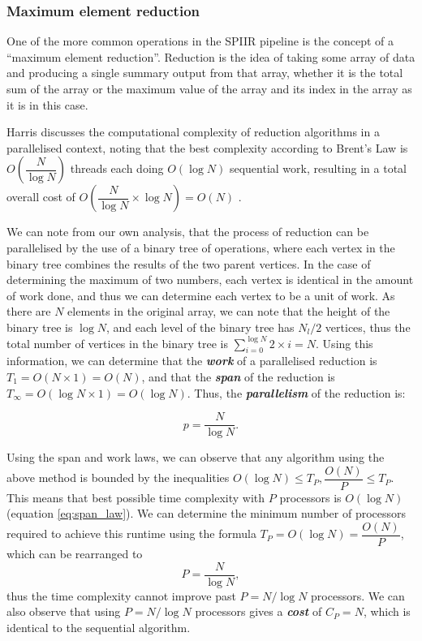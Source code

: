 \documentclass{article}
\begin{document}
\subsubsection{Maximum element reduction} \label{sec:discuss:analysis:reduce}

One of the more common operations in the SPIIR pipeline is the concept of a ``maximum element reduction''.
Reduction is the idea of taking some array of data and producing a single summary output from that array, whether it is the total sum of the array or the maximum value of the array and its index in the array as it is in this case.

Harris discusses the computational complexity of reduction algorithms in a parallelised context, noting that the best complexity according to Brent's Law is \(O(\dfrac{N}{\log N})\) threads each doing \(O(\log N)\) sequential work, resulting in a total overall cost of \(O(\dfrac{N}{\log N}\times{\log N}) = O(N)\) \cite{reduction}.

We can note from our own analysis, that the process of reduction can be parallelised by the use of a binary tree of operations, where each vertex in the binary tree combines the results of the two parent vertices.
In the case of determining the maximum of two numbers, each vertex is identical in the amount of work done, and thus we can determine each vertex to be a unit of work.
As there are \(N\) elements in the original array, we can note that the height of the binary tree is \(\log N\), and each level of the binary tree has \(N_l/2\) vertices, thus the total number of vertices in the binary tree is \(\sum_{i=0}^{\log N}{2\times{i}} = N\).
Using this information, we can determine that the \textit{\textbf{work}} of a parallelised reduction is \(T_1 = O(N\times1) = O(N)\), and that the \textit{\textbf{span}} of the reduction is \(T_\infty = O(\log N \times {1}) = O(\log N)\).
Thus, the \textit{\textbf{parallelism}} of the reduction is:

\[
    p = \dfrac{N}{\log N}.
\]

Using the span and work laws, we can observe that any algorithm using the above method is bounded by the inequalities \(O(\log N) \leq T_P, \dfrac{O(N)}{P} \leq T_P\).
This means that best possible time complexity with \(P\) processors is \(O(\log N)\) (equation \ref{eq:span_law}).
We can determine the minimum number of processors required to achieve this runtime using the formula \(T_P = O(\log N) = \dfrac{O(N)}{P}\), which can be rearranged to
\[
    P = \dfrac{N}{\log N},
\]
thus the time complexity cannot improve past \(P = N/\log N\) processors.
We can also observe that using \(P = N/\log N\) processors gives a \textit{\textbf{cost}} of \(C_P = N\), which is identical to the sequential algorithm.
\\
\end{document}
